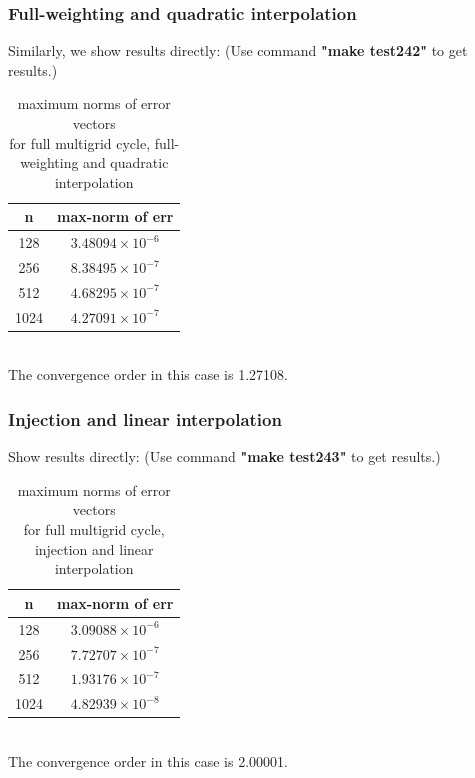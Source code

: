 \documentclass[a4paper,twocolumn]{article}
\theoremstyle{definition}
\begin{document}
\subsubsection{Full-weighting and quadratic interpolation}
Similarly, we show results directly: (Use command \textbf{"make test242"} to get results.)
\begin{table}[!htp]
	\centering
	\begin{tabular}{|c|c|}
		\hline	
		n  & max-norm of err \\
		\hline		
		128 & $3.48094\times 10^{-6}$ \\
		\hline		
		256 & $8.38495\times 10^{-7}$ \\
		\hline		
		512 & $4.68295\times 10^{-7}$ \\
		\hline		
		1024 & $4.27091\times 10^{-7}$ \\
		\hline
	\end{tabular}
	\caption{maximum norms of error vectors \\for full multigrid cycle, full-weighting and quadratic interpolation}
\end{table}\\
The convergence order in this case is 1.27108.
\subsubsection{Injection and linear interpolation}
Show results directly: (Use command \textbf{"make test243"} to get results.)
\begin{table}[!htp]
	\centering
	\begin{tabular}{|c|c|}
		\hline	
		n  & max-norm of err \\
		\hline		
		128 & $3.09088\times 10^{-6}$ \\
		\hline		
		256 & $7.72707\times 10^{-7}$ \\
		\hline		
		512 & $1.93176\times 10^{-7}$ \\
		\hline		
		1024 & $4.82939\times 10^{-8}$ \\
		\hline
	\end{tabular}
	\caption{maximum norms of error vectors \\for full multigrid cycle, injection and linear interpolation}
\end{table}\\
The convergence order in this case is 2.00001.
\end{document}
